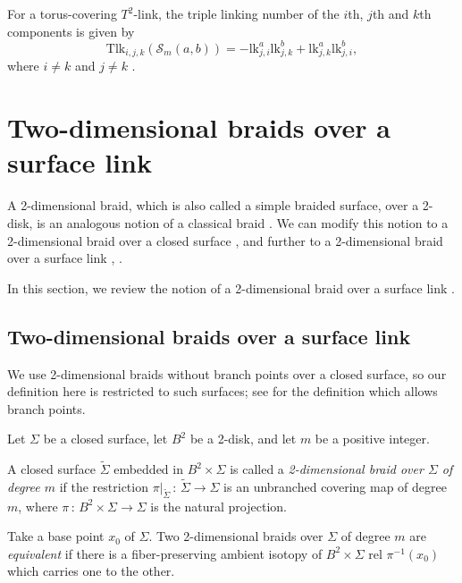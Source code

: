 \documentclass[a4paper,11pt]{amsart}
\numberwithin{equation}{section}
\begin{document}
 
  
For a torus-covering $T^{2}$-link, the triple linking number of the $i$th, $j$th and $k$th components is given by 
\begin{equation}\label{eq:tlk}
 \mathrm{Tlk}_{i,j,k}(\mathcal{S}_{m}(a,b)) = -\mathrm{lk}^{a}_{j,i}\mathrm{lk}^{b}_{j,k} + \mathrm{lk}^{a}_{j,k}\mathrm{lk}^{b}_{j,i}, 
\end{equation}
where $i \neq k$ and $j \neq k$ \cite[Theorem 5.4 and Remark 5.7]{I-N}. 

\section{Two-dimensional braids over a surface link}\label{sec:2}
A 2-dimensional braid, which is also called a simple braided surface, over a 2-disk, is an analogous notion of a classical braid \cite{Kamada92,Kamada02,Rudolph}. 
We can modify this notion to a 2-dimensional braid over a closed surface \cite{N1}, and further to a 2-dimensional braid over a surface link \cite[Section 2.4.2]{CKS}, \cite{N4}. 

In this section, we review the notion of a 2-dimensional braid over a surface link \cite{N4}.


\subsection{Two-dimensional braids over a surface link}
We use 2-dimensional braids without branch points over a closed surface, so our definition here is restricted to such surfaces; see \cite{N1,N4} for the definition which allows branch points. 


Let $\Sigma$ be a closed surface, let $B^2$ be a 2-disk, and let $m$ be a positive integer. 
\begin{definition}
A closed surface $\widetilde{\Sigma}$ embedded in $B^2 \times \Sigma$ is called a {\it 2-dimensional braid over $\Sigma$ of degree $m$} if  
the restriction $\pi |_{\widetilde{\Sigma}} \,:\, \widetilde{\Sigma} \rightarrow \Sigma$ is an unbranched covering map of degree $m$, where $\pi \,:\, B^2 \times \Sigma \to \Sigma$ is the natural projection. 

Take a base point $x_0$ of $\Sigma$. 
Two 2-dimensional braids over $\Sigma$ of degree $m$ are {\it equivalent} if there is a fiber-preserving ambient isotopy of $B^2 \times \Sigma$ rel $\pi^{-1}(x_0)$ which carries one to the other. 

\end{definition}
\end{document}

